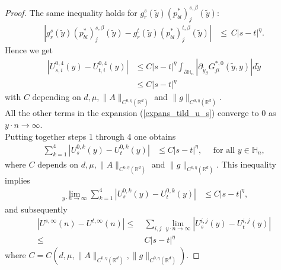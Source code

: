 \documentclass[10pt,a4paper]{amsart}
\begin{document}
\begin{proof}[Proof]
	\noindent The same inequality holds for  $ g^s_r (\tilde{y}) (p_{bl}^{*})_{j}^{s,\beta}(\tilde{y})$:
		\begin{align*}
			|g^s_r (\tilde{y}) (p_{bl}^{*})_{j}^{s,\beta}(\tilde{y})-g^t_r (\tilde{y}) (p_{bl}^{*})_{j}^{t,\beta}(\tilde{y})| 
			&\leq \: C |s-t|^\eta.
		\end{align*}  
		Hence we get 
		\begin{align*}
			|U_{s,i}^{0,4}(y)-U_{t,i}^{0,4}(y)| &\leq  C |s-t|^\eta\int_{\partial\mathbb{H}_n} | \partial_{\tilde{y}_\beta} G^{*,0}_{ji} (\tilde{y}, y)| d\tilde{y}\\
			&\leq  C |s-t|^\eta
		\end{align*}with $C$ depending on $d,\mu,\|A\|_{C^{0,\eta}(\mathbb{R}^d)}$ and $\|g\|_{C^{0,\eta}(\mathbb{R}^d)}$.\\
		
	\noindent	All the other terms in the expansion (\ref{expans_tild_u_s}) converge to $0$ as $y\cdot n \rightarrow \infty .$\\
		
		\noindent 	Putting together steps 1 through 4 one obtains
		\begin{align*}
			\sum_{k=1}^4|U_{s}^{0,k}(y)-U_{t}^{0,k}(y)| &\leq  C |s-t|^\eta, \quad \mbox{ for all } y\in \mathbb{H}_n,
		\end{align*}where $C$ depends on $d,\mu,\|A\|_{C^{0,\eta}(\mathbb{R}^d)}$ and $\|g\|_{C^{0,\eta}(\mathbb{R}^d)}$.
		This inequality implies 
		\begin{align*}
			\lim_{y\cdot n \rightarrow \infty}\sum_{k=1}^4|U_{s}^{0,k}(y)-U_{t}^{0,k}(y)| &\leq  C |s-t|^\eta, 
		\end{align*}
		and subsequently
		\begin{align*}
			| U^{s,\infty}(n) -U^{t,\infty}(n) | 
			\leq &	\:\sum_{i,j} \lim_{y\cdot n \rightarrow \infty}  |U_s^{i,j}(y) -U_t^{i,j}(y)| \\
			\leq & \: C |s-t|^\eta
		\end{align*}
		where  $C=C\left(d,\mu,\|A\|_{C^{0,\eta}(\mathbb{R}^d)},\|g\|_{C^{0,\eta}(\mathbb{R}^d)}\right).$
	\end{proof}
\end{document}
